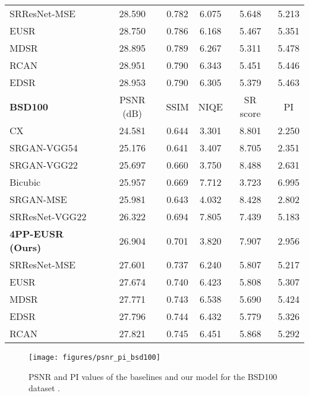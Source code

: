 \documentclass[runningheads]{llncs}
\begin{document}
\begin{table}[t]
\begin{tabular}{lccccc}
		SRResNet-MSE & 28.590 & 0.782 & 6.075 & 5.648 & 5.213 \\
		EUSR & 28.750 & 0.786 & 6.168 & 5.467 & 5.351 \\
		MDSR & 28.895 & 0.789 & 6.267 & 5.311 & 5.478 \\
		RCAN & 28.951 & 0.790 & 6.343 & 5.451 & 5.446 \\
		EDSR & 28.953 & 0.790 & 6.305 & 5.379 & 5.463 \\
		\noalign{\smallskip}
		\noalign{\smallskip}
		\textbf{BSD100} & PSNR (dB) & SSIM & NIQE & SR score & PI \\
		\noalign{\smallskip}
		\hline
		\noalign{\smallskip}
		CX & 24.581 & 0.644 & 3.301 & 8.801 & 2.250 \\
		SRGAN-VGG54 & 25.176 & 0.641 & 3.407 & 8.705 & 2.351 \\
		SRGAN-VGG22 & 25.697 & 0.660 & 3.750 & 8.488 & 2.631 \\
		Bicubic & 25.957 & 0.669 & 7.712 & 3.723 & 6.995 \\
		SRGAN-MSE & 25.981 & 0.643 & 4.032 & 8.428 & 2.802 \\
		SRResNet-VGG22 & 26.322 & 0.694 & 7.805 & 7.439 & 5.183 \\
		\textbf{4PP-EUSR (Ours)} & 26.904 & 0.701 & 3.820 & 7.907 & 2.956 \\
		SRResNet-MSE & 27.601 & 0.737 & 6.240 & 5.807 & 5.217 \\
		EUSR & 27.674 & 0.740 & 6.423 & 5.808 & 5.307 \\
		MDSR & 27.771 & 0.743 & 6.538 & 5.690 & 5.424 \\
		EDSR & 27.796 & 0.744 & 6.432 & 5.779 & 5.326 \\
		RCAN & 27.821 & 0.745 & 6.451 & 5.868 & 5.292
	\end{tabular}
\end{table}

\begin{figure}[t]
	\centering
	\texttt{[image: figures/psnr\_pi\_bsd100]}
	\caption{PSNR and PI values of the baselines and our model for the BSD100 dataset \cite{martin2001database}.}
	\label{fig:psnr_pi_bsd100}
\end{figure}
\end{document}
